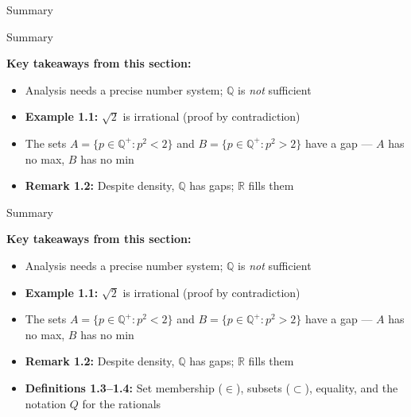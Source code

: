 \documentclass[aspectratio=169,12pt,t]{beamer}
\begin{document}
{\begin{frame}{Summary}
\end{frame}

\begin{frame}{Summary}
  \begin{hlbox}
    \textbf{Key takeaways from this section:}
    \begin{itemize}
      \item Analysis needs a precise number system; $\mathbb{Q}$ is \emph{not} sufficient
      \item \textbf{Example 1.1:} $\sqrt{2}$ is irrational (proof by contradiction)
      \item The sets $A = \{p \in \mathbb{Q}^+ : p^2 < 2\}$ and $B = \{p \in \mathbb{Q}^+ : p^2 > 2\}$ have a \alert{gap} --- $A$ has no max, $B$ has no min
      \item \textbf{Remark 1.2:} Despite density, $\mathbb{Q}$ has gaps; $\mathbb{R}$ fills them
    \end{itemize}
  \end{hlbox}

\end{frame}

\begin{frame}{Summary}
  \begin{hlbox}
    \textbf{Key takeaways from this section:}
    \begin{itemize}
      \item Analysis needs a precise number system; $\mathbb{Q}$ is \emph{not} sufficient
      \item \textbf{Example 1.1:} $\sqrt{2}$ is irrational (proof by contradiction)
      \item The sets $A = \{p \in \mathbb{Q}^+ : p^2 < 2\}$ and $B = \{p \in \mathbb{Q}^+ : p^2 > 2\}$ have a \alert{gap} --- $A$ has no max, $B$ has no min
      \item \textbf{Remark 1.2:} Despite density, $\mathbb{Q}$ has gaps; $\mathbb{R}$ fills them
      \item \textbf{Definitions 1.3--1.4:} Set membership ($\in$), subsets ($\subset$), equality, and the notation $Q$ for the rationals
    \end{itemize}
  \end{hlbox}


\end{frame}}
\end{document}
